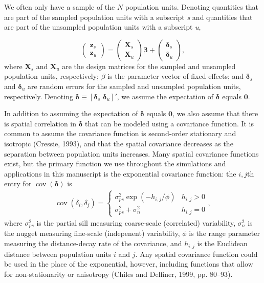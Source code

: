 \documentclass[]{elsarticle} %
\begin{document}
We often only have a sample of the \(N\) population units. Denoting
quantities that are part of the sampled population units with a
subscript \emph{s} and quantities that are part of the unsampled
population units with a subscript \emph{u},

\begin{equation}
\begin{pmatrix} \label{equation:Zmarginal}
    \mathbf{z}_s      \\
    \mathbf{z}_u
\end{pmatrix}
=
\begin{pmatrix}
  \mathbf{X}_s    \\
  \mathbf{X}_u
\end{pmatrix}
\bm{\beta} +
\begin{pmatrix}
\bm{\delta}_s    \\
\bm{\delta}_u
\end{pmatrix},
\end{equation} where \(\mathbf{X}_s\) and \(\mathbf{X}_u\) are the
design matrices for the sampled and unsampled population units,
respectively; \(\beta\) is the parameter vector of fixed effects; and
\(\bm{\delta}_s\) and \(\bm{\delta}_u\) are random errors for the
sampled and unsampled population units, respectively. Denoting
\(\bm{\delta} \equiv [\bm{\delta}_s \,\, \bm{\delta}_u]'\), we assume
the expectation of \(\bm{\delta}\) equals \(\mathbf{0}\).

In addition to assuming the expectation of \(\bm{\delta}\) equals
\(\mathbf{0}\), we also assume that there is spatial correlation in
\(\bm{\delta}\) that can be modeled using a covariance function. It is
common to assume the covariance function is second-order stationary and
isotropic (Cressie, 1993), and that the spatial covariance decreases as
the separation between population units increases. Many spatial
covariance functions exist, but the primary function we use throughout
the simulations and applications in this manuscript is the exponential
covariance function: the \(i,j\)th entry for
\(\mathop{\mathrm{{cov}}}(\bm{\delta})\) is \mbox{}
\begin{align}\label{equation:expcov}
\mathop{\mathrm{{cov}}}(\delta_i, \delta_j) = 
\begin{cases} 
\sigma^2_{ps}\exp(-h_{i,j}/\phi) & h_{i,j} > 0 \\
\sigma^2_{ps} + \sigma^2_n & h_{i,j} = 0
\end{cases}
,
\end{align} where \(\sigma^2_{ps}\) is the partial sill measuring
coarse-scale (correlated) variability, \(\sigma^2_{n}\) is the nugget
measuring fine-scale (indepenent) variability, \(\phi\) is the range
parameter measuring the distance-decay rate of the covariance, and
\(h_{i,j}\) is the Euclidean distance between population units \(i\) and
\(j\). Any spatial covariance function could be used in the place of the
exponential, however, including functions that allow for
non-stationarity or anisotropy (Chiles and Delfiner, 1999, pp. 80--93).
\end{document}
